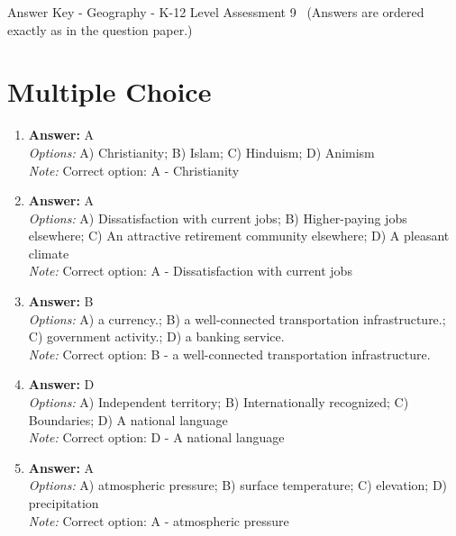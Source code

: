 \documentclass[12pt]{article}
\begin{document}
\begin{center}
Answer Key - Geography - K-12 Level Assessment 9 \
\small (Answers are ordered exactly as in the question paper.)
\end{center}

\section*{Multiple Choice}
\begin{enumerate}[label=\arabic*.]
\item \textbf{Answer:} A
\\ \textit{Options:} A) Christianity; B) Islam; C) Hinduism; D) Animism
\\ \textit{Note:} Correct option: A - Christianity
\item \textbf{Answer:} A
\\ \textit{Options:} A) Dissatisfaction with current jobs; B) Higher-paying jobs elsewhere; C) An attractive retirement community elsewhere; D) A pleasant climate
\\ \textit{Note:} Correct option: A - Dissatisfaction with current jobs
\item \textbf{Answer:} B
\\ \textit{Options:} A) a currency.; B) a well-connected transportation infrastructure.; C) government activity.; D) a banking service.
\\ \textit{Note:} Correct option: B - a well-connected transportation infrastructure.
\item \textbf{Answer:} D
\\ \textit{Options:} A) Independent territory; B) Internationally recognized; C) Boundaries; D) A national language
\\ \textit{Note:} Correct option: D - A national language
\item \textbf{Answer:} A
\\ \textit{Options:} A) atmospheric pressure; B) surface temperature; C) elevation; D) precipitation
\\ \textit{Note:} Correct option: A - atmospheric pressure
\end{enumerate}
\end{document}
